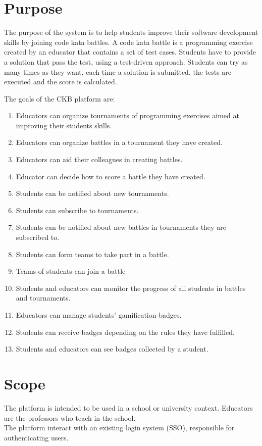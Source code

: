 \section{Purpose}
The purpose of the system is to help students improve their software development skills by joining code kata battles.
A code kata battle is a programming exercise created by an educator that contains a set of test cases.
Students have to provide a solution that pass the test, using a test-driven approach.
Students can try as many times as they want, each time a solution is submitted, the tests are executed and the score is calculated.

The goals of the CKB platform are:
\begin{enumerate}[label=\textbf{G\arabic*}:,leftmargin=1.3cm]
    \item Educators can organize tournaments of programming exercises aimed at improving their students skills.
    \item Educators can organize battles in a tournament they have created.
    \item Educators can aid their colleagues in creating battles.
    \item Educator can decide how to score a battle they have created.
    \item Students can be notified about new tournaments.
    \item Students can subscribe to tournaments.
    \item Students can be notified about new battles in tournaments they are subscribed to.
    \item Students can form teams to take part in a battle.
    \item Teams of students can join a battle
    \item Students and educators can monitor the progress of all students in battles and tournaments.
    \item Educators can manage students’ gamification badges.
    \item Students can receive badges depending on the rules they have fulfilled.
    \item Students and educators can see badges collected by a student.
\end{enumerate}

\pagebreak

\section{Scope}
The platform is intended to be used in a school or university context.
Educators are the professors who teach in the school.\\
The platform interact with an existing login system (SSO), responsible for authenticating users.

